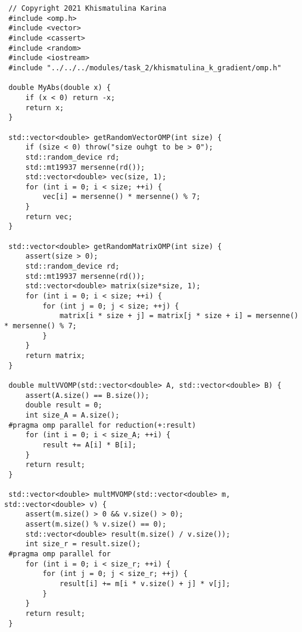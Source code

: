 \documentclass{report}
\begin{document}
 \begin{lstlisting}
 // Copyright 2021 Khismatulina Karina
 #include <omp.h>
 #include <vector>
 #include <cassert>
 #include <random>
 #include <iostream>
 #include "../../../modules/task_2/khismatulina_k_gradient/omp.h"

 double MyAbs(double x) {
     if (x < 0) return -x;
     return x;
 }

 std::vector<double> getRandomVectorOMP(int size) {
     if (size < 0) throw("size ouhgt to be > 0");
     std::random_device rd;
     std::mt19937 mersenne(rd());
     std::vector<double> vec(size, 1);
     for (int i = 0; i < size; ++i) {
         vec[i] = mersenne() * mersenne() % 7;
     }
     return vec;
 }

 std::vector<double> getRandomMatrixOMP(int size) {
     assert(size > 0);
     std::random_device rd;
     std::mt19937 mersenne(rd());
     std::vector<double> matrix(size*size, 1);
     for (int i = 0; i < size; ++i) {
         for (int j = 0; j < size; ++j) {
             matrix[i * size + j] = matrix[j * size + i] = mersenne() * mersenne() % 7;
         }
     }
     return matrix;
 }

 double multVVOMP(std::vector<double> A, std::vector<double> B) {
     assert(A.size() == B.size());
     double result = 0;
     int size_A = A.size();
 #pragma omp parallel for reduction(+:result)
     for (int i = 0; i < size_A; ++i) {
         result += A[i] * B[i];
     }
     return result;
 }

 std::vector<double> multMVOMP(std::vector<double> m, std::vector<double> v) {
     assert(m.size() > 0 && v.size() > 0);
     assert(m.size() % v.size() == 0);
     std::vector<double> result(m.size() / v.size());
     int size_r = result.size();
 #pragma omp parallel for
     for (int i = 0; i < size_r; ++i) {
         for (int j = 0; j < size_r; ++j) {
             result[i] += m[i * v.size() + j] * v[j];
         }
     }
     return result;
 }


\end{lstlisting}
\end{document}
